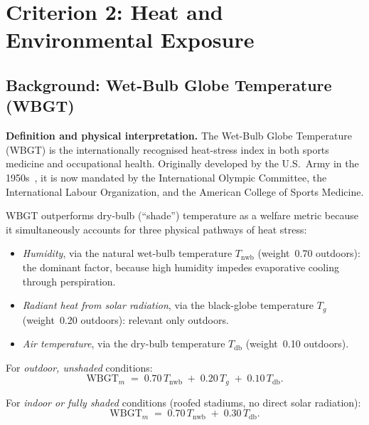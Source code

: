 \documentclass[12pt, letterpaper]{article}
\begin{document}
\section{Criterion 2: Heat and Environmental Exposure}

\subsection{Background: Wet-Bulb Globe Temperature (WBGT)}
\label{sec:wbgt}

\textbf{Definition and physical interpretation.}
The Wet-Bulb Globe Temperature (WBGT) is the internationally recognised
heat-stress index in both sports medicine and occupational health.
Originally developed by the U.S.\ Army in the 1950s~\citep{YaglouMinard1957},
it is now mandated by the International Olympic Committee, the
International Labour Organization, and the American College of Sports
Medicine.

WBGT outperforms dry-bulb (``shade'') temperature as a welfare metric
because it simultaneously accounts for three physical pathways of heat
stress:
\begin{itemize}[noitemsep, topsep=4pt]
  \item \emph{Humidity}, via the natural wet-bulb temperature
        $T_\mathrm{nwb}$ (weight~0.70 outdoors): the dominant factor,
        because high humidity impedes evaporative cooling through
        perspiration.
  \item \emph{Radiant heat from solar radiation}, via the black-globe
        temperature $T_g$ (weight~0.20 outdoors): relevant only outdoors.
  \item \emph{Air temperature}, via the dry-bulb temperature
        $T_\mathrm{db}$ (weight~0.10 outdoors).
\end{itemize}

For \emph{outdoor, unshaded} conditions:
\begin{equation}
  \mathrm{WBGT}_m
    \;=\; 0.70\,T_\mathrm{nwb} \;+\; 0.20\,T_g \;+\; 0.10\,T_\mathrm{db}.
  \label{eq:wbgt_outdoor}
\end{equation}

For \emph{indoor or fully shaded} conditions (roofed stadiums, no direct
solar radiation):
\begin{equation}
  \mathrm{WBGT}_m
    \;=\; 0.70\,T_\mathrm{nwb} \;+\; 0.30\,T_\mathrm{db}.
  \label{eq:wbgt_indoor}
\end{equation}
\end{document}
